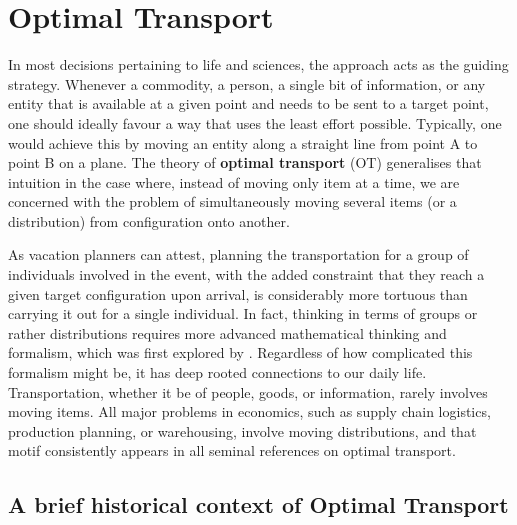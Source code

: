 \newcommand{\mcX}{\mathcal{X}}
\newcommand{\bfitr}{\symbfit{r}}
\newcommand{\bfitc}{\symbfit{c}}

\chapter{Optimal Transport}\label{chap:optimal-transport}

In most decisions pertaining to life and sciences, the  approach acts as the guiding strategy. Whenever a commodity, a person, a single bit of information, or any entity that is available at a given point and needs to be sent to a target point, one should ideally favour a way that uses the least effort possible. Typically, one would achieve this by moving an entity along a straight line from point A to point B on a plane.
The theory of \textbf{optimal transport} (OT) generalises that intuition in the case where, instead of moving only item at a time, we are concerned with the problem of simultaneously moving several items (or a distribution) from configuration onto another.

As vacation planners can attest, planning the transportation for a group of individuals involved in the event, with the added constraint that they reach a given target configuration upon arrival, is considerably more tortuous than carrying it out for a single individual. In fact, thinking in terms of groups or rather distributions requires more advanced mathematical thinking and formalism, which was first explored by \textcite{monge1781memoire}. Regardless of how complicated this formalism might be, it has deep rooted connections to our daily life. 
Transportation, whether it be of people, goods, or information, rarely involves moving items. All major problems in economics, such as supply chain logistics, production planning, or warehousing, involve moving distributions, and that motif consistently appears in all seminal references on optimal transport.

\section{A brief historical context of Optimal Transport}\label{sec:ot-history}

